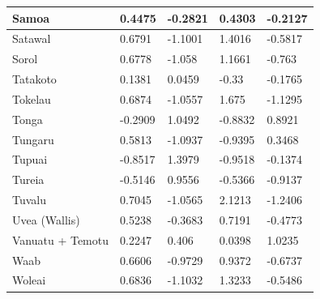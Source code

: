 \documentclass[a4paper,10pt]{article} %
\begin{document}
\begin{landscape}
\begin{longtable}{| p{2.6cm} |  p{2cm} | p{2cm}  | p{2cm}  | p{2cm}|}
 Samoa & 0.4475 & -0.2821 & 0.4303 & -0.2127 \\ \hline
 Satawal & 0.6791 & -1.1001 & 1.4016 & -0.5817 \\ \hline
 Sorol & 0.6778 & -1.058 & 1.1661 & -0.763 \\ \hline
 Tatakoto & 0.1381 & 0.0459 & -0.33 & -0.1765 \\ \hline
 Tokelau & 0.6874 & -1.0557 & 1.675 & -1.1295 \\ \hline
 Tonga & -0.2909 & 1.0492 & -0.8832 & 0.8921 \\ \hline
 Tungaru & 0.5813 & -1.0937 & -0.9395 & 0.3468 \\ \hline
 Tupuai & -0.8517 & 1.3979 & -0.9518 & -0.1374 \\ \hline
 Tureia & -0.5146 & 0.9556 & -0.5366 & -0.9137 \\ \hline
 Tuvalu & 0.7045 & -1.0565 & 2.1213 & -1.2406 \\ \hline
 Uvea (Wallis) & 0.5238 & -0.3683 & 0.7191 & -0.4773 \\ \hline
 Vanuatu + Temotu & 0.2247 & 0.406 & 0.0398 & 1.0235 \\ \hline
 Waab & 0.6606 & -0.9729 & 0.9372 & -0.6737 \\ \hline
 Woleai & 0.6836 & -1.1032 & 1.3233 & -0.5486 \\ \hline





 \end{longtable}
\end{landscape}
\end{document}
